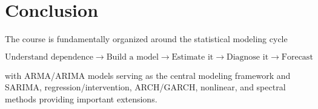 \documentclass[11pt]{article}
\begin{document}
\section*{Conclusion}

The course is fundamentally organized around the statistical modeling
cycle

\[
\boxed{
\text{Understand dependence}
\rightarrow
\text{Build a model}
\rightarrow
\text{Estimate it}
\rightarrow
\text{Diagnose it}
\rightarrow
\text{Forecast}
}
\]

with ARMA/ARIMA models serving as the central modeling framework and
SARIMA, regression/intervention, ARCH/GARCH, nonlinear, and spectral
methods providing important extensions.
\end{document}
